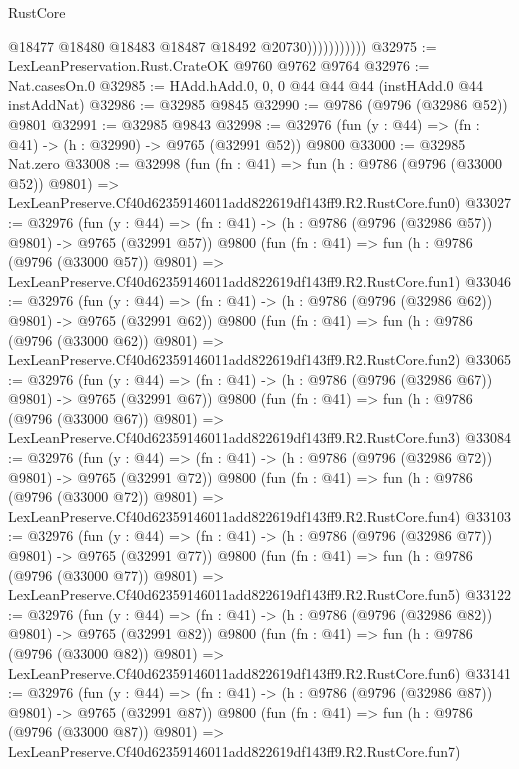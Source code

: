 \begin{lexlean}{RustCore}
\begin{coremodule}
                          @18477
                          @18480
                          @18483
                          @18487
                          @18492
                          @20730)))))))))))
@32975 := LexLeanPreservation.Rust.CrateOK @9760 @9762 @9764
@32976 := Nat.casesOn.{0}
@32985 := HAdd.hAdd.{0, 0, 0} @44 @44 @44 (instHAdd.{0} @44 instAddNat)
@32986 := @32985 @9845
@32990 := @9786 (@9796 (@32986 @52)) @9801
@32991 := @32985 @9843
@32998 := @32976 (fun (y : @44) => (fn : @41) -> (h : @32990) -> @9765 (@32991 @52)) @9800
@33000 := @32985 Nat.zero
@33008 := @32998
    (fun (fn : @41) =>
    fun (h : @9786 (@9796 (@33000 @52)) @9801) =>
    LexLeanPreserve.Cf40d62359146011add822619df143ff9.R2.RustCore.fun0)
@33027 := @32976
    (fun (y : @44) => (fn : @41) -> (h : @9786 (@9796 (@32986 @57)) @9801) -> @9765 (@32991 @57))
    @9800
    (fun (fn : @41) =>
    fun (h : @9786 (@9796 (@33000 @57)) @9801) =>
    LexLeanPreserve.Cf40d62359146011add822619df143ff9.R2.RustCore.fun1)
@33046 := @32976
    (fun (y : @44) => (fn : @41) -> (h : @9786 (@9796 (@32986 @62)) @9801) -> @9765 (@32991 @62))
    @9800
    (fun (fn : @41) =>
    fun (h : @9786 (@9796 (@33000 @62)) @9801) =>
    LexLeanPreserve.Cf40d62359146011add822619df143ff9.R2.RustCore.fun2)
@33065 := @32976
    (fun (y : @44) => (fn : @41) -> (h : @9786 (@9796 (@32986 @67)) @9801) -> @9765 (@32991 @67))
    @9800
    (fun (fn : @41) =>
    fun (h : @9786 (@9796 (@33000 @67)) @9801) =>
    LexLeanPreserve.Cf40d62359146011add822619df143ff9.R2.RustCore.fun3)
@33084 := @32976
    (fun (y : @44) => (fn : @41) -> (h : @9786 (@9796 (@32986 @72)) @9801) -> @9765 (@32991 @72))
    @9800
    (fun (fn : @41) =>
    fun (h : @9786 (@9796 (@33000 @72)) @9801) =>
    LexLeanPreserve.Cf40d62359146011add822619df143ff9.R2.RustCore.fun4)
@33103 := @32976
    (fun (y : @44) => (fn : @41) -> (h : @9786 (@9796 (@32986 @77)) @9801) -> @9765 (@32991 @77))
    @9800
    (fun (fn : @41) =>
    fun (h : @9786 (@9796 (@33000 @77)) @9801) =>
    LexLeanPreserve.Cf40d62359146011add822619df143ff9.R2.RustCore.fun5)
@33122 := @32976
    (fun (y : @44) => (fn : @41) -> (h : @9786 (@9796 (@32986 @82)) @9801) -> @9765 (@32991 @82))
    @9800
    (fun (fn : @41) =>
    fun (h : @9786 (@9796 (@33000 @82)) @9801) =>
    LexLeanPreserve.Cf40d62359146011add822619df143ff9.R2.RustCore.fun6)
@33141 := @32976
    (fun (y : @44) => (fn : @41) -> (h : @9786 (@9796 (@32986 @87)) @9801) -> @9765 (@32991 @87))
    @9800
    (fun (fn : @41) =>
    fun (h : @9786 (@9796 (@33000 @87)) @9801) =>
    LexLeanPreserve.Cf40d62359146011add822619df143ff9.R2.RustCore.fun7)

\end{coremodule}
\end{lexlean}
